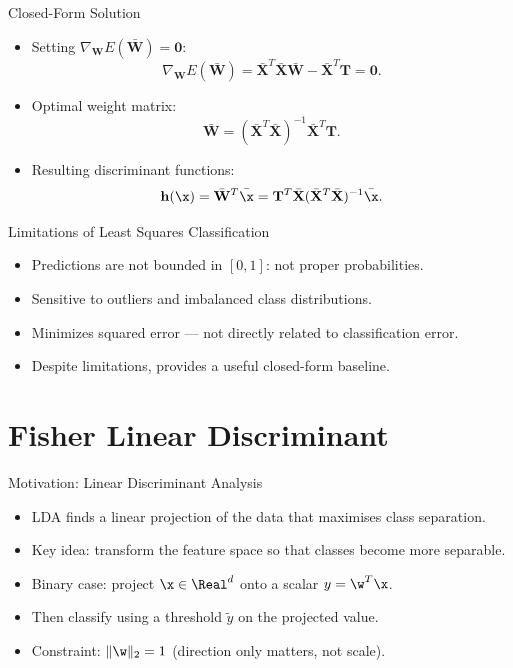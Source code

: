 \begin{frame}{Closed-Form Solution}
  \begin{itemize}
    \item Setting $\nabla_{\mathbf{W}} E(\bar{\mathbf{W}}) = \mathbf{0}$:
    \[
      \nabla_{\mathbf{W}} E(\bar{\mathbf{W}}) = \bar{\mathbf{X}}^T\bar{\mathbf{X}}\bar{\mathbf{W}} - \bar{\mathbf{X}}^T\mathbf{T} = \mathbf{0}.
    \]
    \item Optimal weight matrix:
    \[
      \bar{\mathbf{W}} = (\bar{\mathbf{X}}^T\bar{\mathbf{X}})^{-1}\bar{\mathbf{X}}^T\mathbf{T}.
    \]
    \item Resulting discriminant functions:
    \[
      \mathbf{h}(\x) = \bar{\mathbf{W}}^T\bar{\x} = \mathbf{T}^T\bar{\mathbf{X}}(\bar{\mathbf{X}}^T\bar{\mathbf{X}})^{-1}\bar{\x}.
    \]
  \end{itemize}
\end{frame}

\begin{frame}{Limitations of Least Squares Classification}
  \begin{itemize}
    \item Predictions are \alert{not bounded} in $[0,1]$: not proper probabilities.
    \item Sensitive to \alert{outliers} and imbalanced class distributions.
    \item Minimizes squared error — not directly related to classification error.
    \item Despite limitations, provides a useful \alert{closed-form baseline}.
  \end{itemize}
\end{frame}

\section{Fisher Linear Discriminant}

\begin{frame}{Motivation: Linear Discriminant Analysis}
  \begin{itemize}
    \item LDA finds a \alert{linear projection} of the data that maximises class separation.
    \item Key idea: transform the feature space so that classes become more separable.
    \item Binary case: project $\x \in \Real^d$ onto a scalar $y = \w^T\x$.
    \item Then classify using a threshold $\tilde{y}$ on the projected value.
    \item Constraint: $\|\w\|_2 = 1$ (direction only matters, not scale).
  \end{itemize}
\end{frame}


